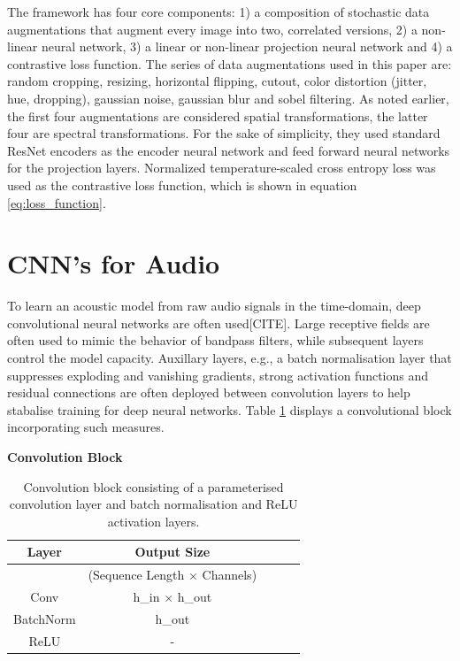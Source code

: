The framework has four core components: 1) a composition of stochastic data augmentations that augment every image into two, correlated versions, 2) a non-linear neural network, 3) a linear or non-linear projection neural network and 4) a contrastive loss function.
The series of data augmentations used in this paper are: random cropping, resizing, horizontal flipping, cutout, color distortion (jitter, hue, dropping), gaussian noise, gaussian blur and sobel filtering. As noted earlier, the first four augmentations are considered spatial transformations, the latter four are spectral transformations.
For the sake of simplicity, they used standard ResNet encoders as the encoder neural network and feed forward neural networks for the projection layers.
Normalized temperature-scaled cross entropy loss was used as the contrastive loss function, which is shown in equation \ref{eq:loss_function}.


\section{CNN's for Audio}
To learn an acoustic model from raw audio signals in the time-domain, deep convolutional neural networks are often used[CITE]. Large receptive fields are often used to mimic the behavior of bandpass filters, while subsequent layers control the model capacity. Auxillary layers, e.g., a batch normalisation layer that suppresses exploding and vanishing gradients, strong activation functions and residual connections are often deployed between convolution layers to help stabalise training for deep neural networks. Table \ref{tab:conv_block} displays a convolutional block incorporating such measures.




\begin{table}
    \centering
    \textbf{Convolution Block} \\
    \begin{tabular}{ccccc}
        \toprule Layer & Output Size \\\hline
        & (Sequence Length $\times$ Channels) \\
        Conv & h\_in $\times$ h\_out \\
        BatchNorm & h\_out \\
        ReLU & - \\
        \bottomrule
    \end{tabular}
    \caption{Convolution block consisting of a parameterised convolution layer and batch normalisation and ReLU activation layers.}
    \label{tab:conv_block}
\end{table}


